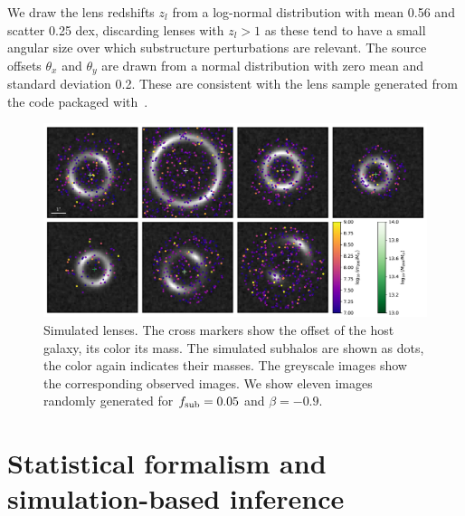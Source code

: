 \documentclass[twocolumn]{aastex62}
\begin{document}
We draw the lens redshifts $z_l$ from a log-normal distribution with mean 0.56 and scatter 0.25 dex, discarding lenses with $z_l > 1$ as these tend to have a small angular size over which substructure perturbations are relevant. The source offsets $\theta_x$ and $\theta_y$ are drawn from a normal distribution with zero mean and standard deviation 0.2. These are consistent with the lens sample generated from the  code packaged with~\citet{2015ApJ...811...20C}.

\begin{figure}[tbp]
\centering
\includegraphics[width=1.\textwidth]{figures/simulations}
\caption{Simulated lenses. The cross markers show the offset of the host galaxy, its color its mass. The simulated subhalos are shown as dots, the color again indicates their masses. The greyscale images show the corresponding observed images. We show eleven images randomly generated for $f_{\mathrm{sub}} = 0.05$ and $\beta = -0.9$.}
\label{fig:simulations}
\end{figure}


\section{Statistical formalism and simulation-based inference}
\label{sec:lfi-formalism}
\end{document}
